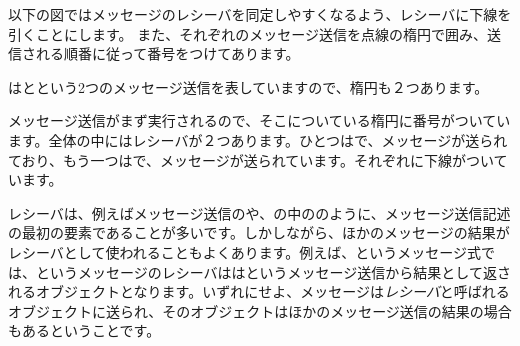 \documentclass[a4paper,10pt,twoside]{book}
\begin{document}


以下の図ではメッセージのレシーバを同定しやすくなるよう、レシーバに下線を引くことにします。
また、それぞれのメッセージ送信を点線の楕円で囲み、送信される順番に従って番号をつけてあります。


はとという2つのメッセージ送信を表していますので、楕円も２つあります。

メッセージ送信がまず実行されるので、そこについている楕円に番号がついています。全体の中にはレシーバが２つあります。ひとつはで、メッセージが送られており、もう一つはで、メッセージが送られています。それぞれに下線がついています。

レシーバは、例えばメッセージ送信のや、の中ののように、メッセージ送信記述の最初の要素であることが多いです。しかしながら、ほかのメッセージの結果がレシーバとして使われることもよくあります。例えば、というメッセージ式では、というメッセージのレシーバははというメッセージ送信から結果として返されるオブジェクトとなります。いずれにせよ、メッセージは\emph{レシーバ}と呼ばれるオブジェクトに送られ、そのオブジェクトはほかのメッセージ送信の結果の場合もあるということです。
\end{document}
